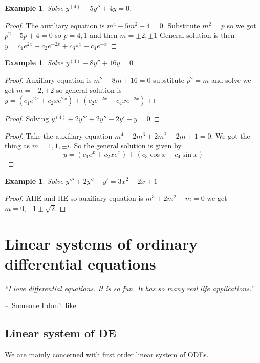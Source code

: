 \documentclass[oneside,11pt,pdftex,final]{book}%
\makeatletter
\numberwithin{equation}{section}
\newenvironment{chapquote}[2][2em]
{\setlength{\@tempdima}{#1}%
	\def\chapquote@author{#2}%
	\parshape 1 \@tempdima \dimexpr\textwidth-2\@tempdima\relax%
	\itshape}
{\par\normalfont\hfill--\ \chapquote@author\hspace*{\@tempdima}\par\bigskip}
\newtheorem{example}[theorem]{Example}
\numberwithin{section}{chapter}
\numberwithin{equation}{chapter}
\makeatother
\begin{document}
\begin{example}
	Solve $ y^{(4)}-5y''+4y=0 $.
\end{example}
\begin{proof}
	The auxiliary equation is $ m^4-5m^2+4=0 $. Substitute $ m^2=p $ so we got $ p^2-5p+4=0 $ so $ p=4,1 $ and then $ m=\pm2,\pm1 $
	General solution is then $ y=c_1e^{2x}+c_2e^{-2x}+c_3 e^{x}+c_4e^{-x} $
\end{proof}

\begin{example}
	Solve $ y^{(4)}-8y''+16y=0 $
\end{example}
\begin{proof}
	Auxiliary equation is $ m^2-8m+16=0 $ substitute $ p^2=m $  and solve we get $ m=\pm2, \pm 2 $  so general solution is $ y=(c_1e^{2x}+c_2xe^{2x})+(c_2e^{-2x}+c_4xe^{-2x}) $
\end{proof}

\begin{proof}
	Solving $ y^{(4)}+2y'''+2y''-2y'+y=0 $
\end{proof}
\begin{proof}
	Take the auxiliary equation $ m^4-2m^3+2m^2-2m+1=0 $. We got the thing as $ m=1,1,\pm i $. So the general solution is given by 
	\[ y=(c_1e^{x}+c_2xe^{x})+(c_3 \cos x + c_4 \sin x)  \]
\end{proof}

\begin{example}
	Solve $ y'''+2y''-y'=3x^2-2x+1 $
\end{example}
\begin{proof}
	AHE and HE so auxiliary equation is $ m^3+2m^2-m=0 $ we get $ m=0,-1\pm \sqrt{2} $
\end{proof}


\chapter{Linear systems of ordinary differential equations}
\begin{chapquote}{Someone I don't like}
	``I love differential equations. It is so fun. It has so many real life applications.''
\end{chapquote}

\section{Linear system of DE}
We are mainly concerned with first order linear system of ODEs.\\
\end{document}

